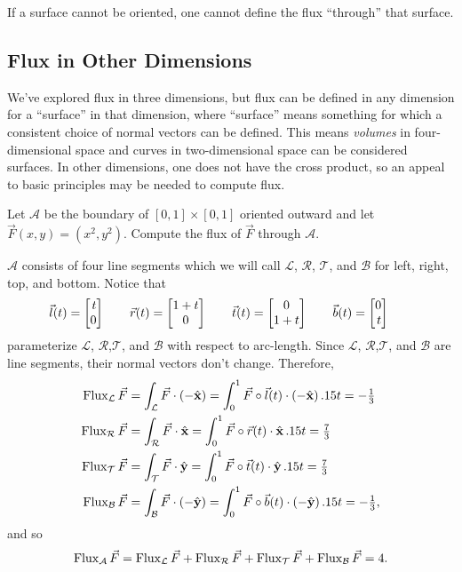 If a surface cannot be oriented, one cannot define the flux ``through'' that surface.

\subsection{Flux in Other Dimensions}

We've explored flux in three dimensions, but flux can be defined in any dimension
for a ``surface'' in that dimension, where ``surface'' means something for which a
consistent choice of normal vectors can be defined.  This means \emph{volumes} in four-dimensional
space  and curves in two-dimensional space can be considered surfaces.  In other dimensions,
one does not have the cross product, so an appeal to basic principles may be needed to compute
flux.

\begin{example}
	Let $\mathcal A$ be the boundary of $[0,1]\times[0,1]$
	oriented outward and let $\vec F(x,y)=(x^2,y^2)$.  Compute the flux of $\vec F$
	through $\mathcal A$.

	$\mathcal A$ consists of four line segments which we will call $\mathcal L$, $\mathcal R$,
	$\mathcal T$, and $\mathcal B$ for left, right, top, and bottom.  Notice that
	\[
		\vec l(t) = \mat{t\\0}\qquad
		\vec r(t) = \matc{1+t\\0}\qquad
		\vec t(t) = \matc{0\\1+t}\qquad
		\vec b(t) = \mat{0\\t}\qquad
	\]
	parameterize $\mathcal L$, $\mathcal R$,$\mathcal T$, and $\mathcal B$ with respect to
	arc-length.  Since $\mathcal L$, $\mathcal R$,$\mathcal T$, and $\mathcal B$ are line segments,
	their normal vectors don't change.  Therefore,
	\begin{align*}
		\operatorname{Flux}_{\mathcal L}\vec F &= \int_{\mathcal L}\vec F\cdot (-{\hat {\mathbf x}})
		=\int_0^1 \vec F\circ \vec l(t)\cdot (-{\hat {\mathbf x}})\,.15 t = -\tfrac{1}{3}
		\\
		\operatorname{Flux}_{\mathcal R}\vec F &= \int_{\mathcal R}\vec F\cdot {\hat {\mathbf x}}
		=\int_0^1 \vec F\circ \vec r(t)\cdot {\hat {\mathbf x}}\,.15 t = \tfrac{7}{3}
	\\
		\operatorname{Flux}_{\mathcal T}\vec F &= \int_{\mathcal T}\vec F\cdot {\hat {\mathbf y}}
		=\int_0^1 \vec F\circ \vec t(t)\cdot {\hat {\mathbf y}}\,.15 t = \tfrac{7}{3}
	\\
		\operatorname{Flux}_{\mathcal B}\vec F &= \int_{\mathcal B}\vec F\cdot (-{\hat {\mathbf y}})
		=\int_0^1 \vec F\circ \vec b(t)\cdot (-{\hat {\mathbf y}})\,.15 t = -\tfrac{1}{3},
	\end{align*}
	and so
	\[
		\operatorname{Flux}_{\mathcal A}\vec F = \operatorname{Flux}_{\mathcal L}\vec F + \operatorname{Flux}_{\mathcal R}\vec F
		+\operatorname{Flux}_{\mathcal T}\vec F+\operatorname{Flux}_{\mathcal B}\vec F = 4.
	\]
\end{example}


